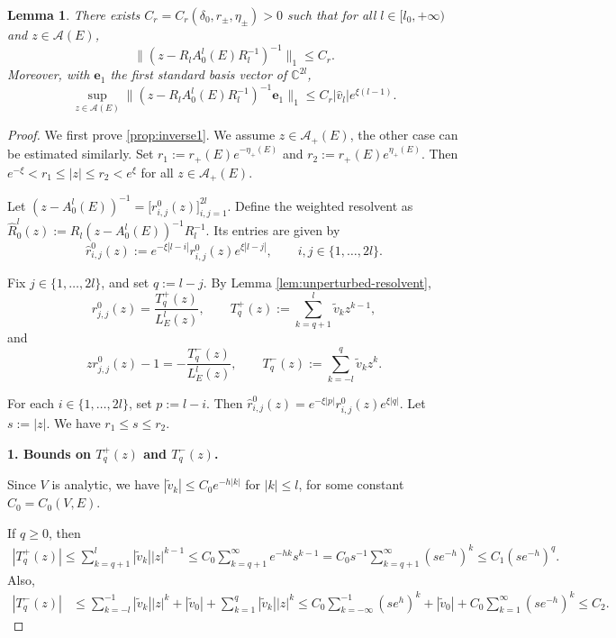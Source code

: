 \documentclass[reqno,11pt]{amsart}
\newtheorem{lemma}{Lemma}[section]
\begin{document}
\begin{lemma}
\label{prop:weighted}
There exists $C_r = C_r(\delta_0, r_\pm,\eta_\pm)>0$ such that for all $l\in[l_0,+\infty)$ and $z\in\mathcal{A}(E)$,
\begin{equation}\label{prop:inverse1}
\|(z-R_l A_{0}^{l}(E)R_l^{-1})^{-1}\|_{1}\le C_r.
\end{equation}
Moreover, with $\mathbf e_1$ the first standard basis vector of $\mathbb{C}^{2l}$, 
\begin{equation}\label{prop:inverse2}
\sup_{z\in\mathcal{A}(E)}\|(z-R_l A_{0}^{l}(E)R_l^{-1})^{-1}\mathbf e_1\|_{1}\le C_r|\hat{v}_l|e^{\xi(l-1)}.
\end{equation}
\end{lemma}
\begin{proof}
We first prove \eqref{prop:inverse1}. We assume $z\in\mathcal{A}_+(E)$, the other case can be estimated similarly. Set $r_1:=r_+(E) e^{-\eta_+(E)}$ and $r_2:=r_+(E) e^{\eta_+(E)}$. Then $e^{-\xi}<r_1\le |z|\le r_2<e^\xi$ for all $z\in\mathcal A_+(E)$.

Let $(z-A_{0}^{l}(E))^{-1} = \bigl[r_{i,j}^0(z)\bigr]_{i,j=1}^{2l}$. Define the weighted resolvent as
$
\widehat R^{l}_0(z):= R_l (z-A_{0}^{l}(E))^{-1}R_l^{-1}.
$
Its entries are given by
$$
\widehat r_{i,j}^0(z) := e^{-\xi|l-i|}r_{i,j}^0(z)e^{\xi|l-j|}, \qquad i,j\in\{1,\dots,2l\}.
$$

Fix $j\in\{1,\dots,2l\}$, and set $q:=l-j$. By Lemma \ref{lem:unperturbed-resolvent},
$$
r_{j,j}^0(z)=\frac{T_q^+(z)}{L^{l}_{E}(z)}, \qquad T_q^+(z):=\sum_{k=q+1}^{l}\widetilde v_k z^{k-1},
$$
and
$$
zr_{j,j}^0(z)-1 = -\frac{T_q^-(z)}{L^{l}_{E}(z)}, \qquad T_q^-(z):=\sum_{k=-l}^{q}\widetilde v_k z^k.
$$

For each $i\in\{1,\dots,2l\}$, set $p:=l-i$. Then $\widehat r_{i,j}^0(z) = e^{-\xi|p|}r_{i,j}^0(z)e^{\xi|q|}$. Let $s:=|z|$. We have $r_1\le s\le r_2$.

\textbf{1. Bounds on $T_q^+(z)$ and $T_q^-(z)$.}

Since $V$ is analytic, we have $|\widetilde v_k|\le C_0 e^{-h|k|}$ for $|k|\le l$, for some constant $C_0=C_0(V,E)$.

If $q\ge 0$, then
\begin{align}
|T_q^+(z)| \le \sum_{k=q+1}^{l} |\widetilde v_k||z|^{k-1} \le C_0\sum_{k=q+1}^{\infty} e^{-h k}s^{k-1} 
= C_0 s^{-1}\sum_{k=q+1}^{\infty}(s e^{-h})^k \le C_1 (s e^{-h})^q .
\label{eq:Tplus}
\end{align}
Also,
\begin{align}
|T_q^-(z)| &\le \sum_{k=-l}^{-1} |\widetilde v_k||z|^k+|\widetilde v_0| +\sum_{k=1}^{q}|\widetilde v_k||z|^k 
\le C_0\sum_{k=-\infty}^{-1}(s e^h)^k +|\widetilde v_0| +C_0\sum_{k=1}^{\infty}(s e^{-h})^k \le C_2 .
\label{eq:Tminus}
\end{align}


\end{proof}
\end{document}
